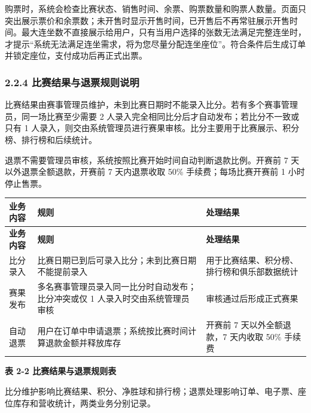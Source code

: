 \documentclass[UTF8,zihao=-4,a4paper]{ctexart}
\newcommand{\tablecaptionline}[1]{\vspace{-1.6em}\begin{center}\small\bfseries #1\end{center}\vspace{0.2em}}
\begin{document}
购票时，系统会检查比赛状态、销售时间、余票、购票数量和购票人数量。页面只突出展示票价和余票数；未开售时显示开售时间，已开售后不再常驻展示开售时间。最大连坐数不直接展示给用户，只有当用户选择的张数无法满足完整连坐时，才提示“系统无法满足连坐需求，将为您尽量分配连坐座位”。符合条件后生成订单并锁定座位，支付成功后再正式出票。

\subsubsection*{2.2.4 比赛结果与退票规则说明}
{}

比赛结果由赛事管理员维护，未到比赛日期时不能录入比分。若有多个赛事管理员，同一场比赛至少需要 2 人录入完全相同比分后才自动发布；若比分不一致或只有 1 人录入，则交由系统管理员进行赛果审核。比分主要用于比赛展示、积分榜、排行榜和后续统计。

退票不需要管理员审核，系统按照比赛开始时间自动判断退款比例。开赛前 7 天以外退票全额退款，开赛前 7 天内退票收取 50\% 手续费；每场比赛开赛前 1 小时停止售票。


\begin{center}
\small
\begin{longtable}{>{\raggedright\arraybackslash}p{} >{\raggedright\arraybackslash}p{} >{\raggedright\arraybackslash}p{}}
\toprule
\rowcolor{tablehead}
\textbf{业务内容} & \textbf{规则} & \textbf{处理结果} \\
\midrule
\endfirsthead
\toprule
\rowcolor{tablehead}
\textbf{业务内容} & \textbf{规则} & \textbf{处理结果} \\
\midrule
\endhead
比分录入 & 比赛日期已到后可录入比分；未到比赛日期不能提前录入 & 用于比赛结果、积分榜、排行榜和俱乐部数据统计 \\
\midrule
赛果发布 & 多名赛事管理员录入同一比分时自动发布；比分冲突或仅 1 人录入时交由系统管理员审核 & 审核通过后形成正式赛果 \\
\midrule
自动退票 & 用户在订单中申请退票；系统按比赛时间计算退款金额并释放库存 & 开赛前 7 天以外全额退款，7 天内收取 50\% 手续费 \\
\midrule
\bottomrule
\end{longtable}
\end{center}

\tablecaptionline{表 2-2 比赛结果与退票规则表}

比分维护影响比赛结果、积分、净胜球和排行榜；退票处理影响订单、电子票、座位库存和营收统计，两类业务分别记录。
\end{document}

